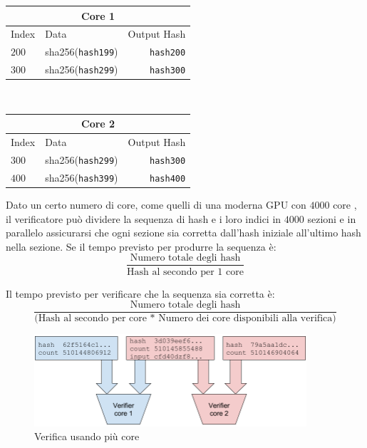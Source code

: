 \documentclass[12pt]{article}
\begin{document}
\begin{center}

\begin{tabular}{l l r}
    \multicolumn{3}{c}{Core 1} \\ \hline
    Index & Data & Output Hash \\ \hline
    $200$ & sha256(\texttt{hash199}) & \texttt{hash200} \\
    $300$ & sha256(\texttt{hash299}) & \texttt{hash300}\\
    \end{tabular}\\

  \begin{tabular}{l l r}
    \multicolumn{3}{c}{Core 2} \\
    \hline
    Index & Data & Output Hash \\ \hline
    $300$ & sha256(\texttt{hash299}) & \texttt{hash300} \\
    $400$ & sha256(\texttt{hash399}) & \texttt{hash400}\\
    \end{tabular}

\end{center}


Dato un certo numero di core, come quelli di una moderna GPU con $4000$ core , il verificatore può dividere la sequenza di hash e i loro indici in $4000$ sezioni  e in parallelo assicurarsi che ogni sezione sia corretta dall'hash iniziale all'ultimo hash nella sezione. Se il tempo previsto per produrre la sequenza è:\\


\[
\frac{\textrm{Numero totale degli hash}}{\textrm{Hash al secondo per 1 core}}
\]

\noindent Il tempo previsto per verificare che la sequenza sia corretta è:\\

\[
\frac{\textrm{Numero totale degli hash}}{\textrm{(Hash al secondo per core * Numero dei core disponibili alla verifica)}}
\]

\begin{figure}
  \begin{center}
    \centering
    \includegraphics[width=0.9\textwidth]{figures/fig_4.png}
    \caption[Figure 4]{Verifica usando più core\label{fig:poh_verify}}
  \end{center}
  \end{figure}
\end{document}
